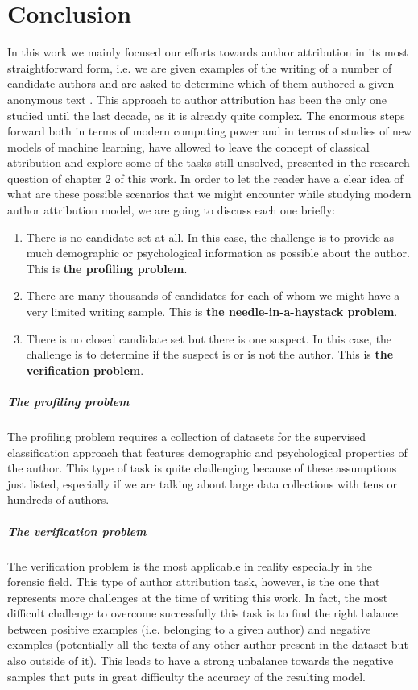 \chapter{Conclusion}
In this work we mainly focused our efforts towards author attribution in its most straightforward form, i.e. we are given examples of the writing of a number of candidate authors and are asked
to determine which of them authored a given anonymous text \cite{koppel2009computational}.
This approach to author attribution has been the only one studied until the last decade, as it is already quite complex.
The enormous steps forward both in terms of modern computing power and in terms of studies of new models of machine learning, have allowed to leave the concept of classical attribution and explore some of the tasks still unsolved, presented in the research question of chapter 2 of this work. In order to let the reader have a clear idea of what are these possible scenarios that we might encounter while studying modern author attribution model, we are going to discuss each one briefly:
\begin{enumerate}
	\item There is no candidate set at all. In this case, the challenge is to provide as much demographic or psychological information as possible about the author. This is \textbf{the profiling problem}.
	\item There are many thousands of candidates for each of whom	we might have a very limited writing sample. This is \textbf{the needle-in-a-haystack problem}.
	\item There is no closed candidate set but there is one suspect.
	In this case, the challenge is to determine if the suspect is or is not the author. This is \textbf{the verification problem}.
\end{enumerate}

\paragraph{The profiling problem} The profiling problem requires a collection of datasets for the supervised classification approach that features demographic and psychological properties of the author. This type of task is quite challenging because of these assumptions just listed, especially if we are talking about large data collections with tens or hundreds of authors.

\paragraph{The verification problem} The verification problem is the most applicable in reality especially in the forensic field. This type of author attribution task, however, is the one that represents more challenges at the time of writing this work. In fact, the most difficult challenge to overcome successfully this task is to find the right balance between positive examples (i.e. belonging to a given author) and negative examples (potentially all the texts of any other author present in the dataset but also outside of it).
This leads to have a strong unbalance towards the negative samples that puts in great difficulty the accuracy of the resulting model.

